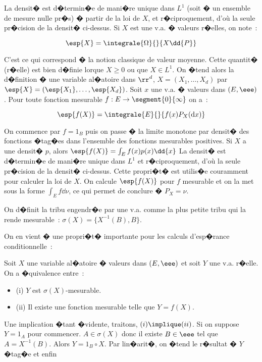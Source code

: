 \rmq La densit� est d�termin�e de mani�re unique dans $L^{1}$ (soit � un ensemble de mesure nulle pr�s) � partir de la loi de $X$, 
et r�ciproquement, d'o\`u la seule pr�cision de la densit� ci-dessus.
 Si $X$ est une v.a. � valeurs r�elles, on note~:\par
$$\esp{X} = \integrale{\Omega}{}{X\dd{P}}$$\par
C'est ce qui correspond � la notion classique de valeur moyenne.
\rmq Cette quantit� (r�elle) est bien d�finie lorque $X\geq 0$ ou que $X\in L^1$. On �tend alors la d�finition � une variable al�atoire
dans ${\rr}^d$, $X = (X_1,\ldots,X_d)$ par $\esp{X} = (\esp{X_1},\ldots,\esp{X_d})$.
\prop{} Soit $x$ une v.a. � valeurs dans $(E,\eee)$. Pour toute fonction mesurable $f : E\to \segment{0}{\infty}$ on a~:\par
$$\esp{f(X)} = \integrale{E}{}{f(x)P_X(\mathrm{d}x)}$$\par
\dem On commence par $f = 1_B$ puis on passe � la limite monotone par densit� des fonctions �tag�es dans l'ensemble des fonctions 
mesurables positives.
\rmq Si $X$ a une densit� $p$, alors $\esp{f(X)} = \int_E{f(x)p(x)\dd{x}}$
\rmq La densit� est d�termin�e de mani�re unique dans $L^{1}$ et r�ciproquement, d'o\`u la seule pr�cision de la densit� ci-dessus.
\rmq Cette propri�t� est utilis�e couramment pour calculer la loi de $X$. On calcule $\esp{f(X)}$ pour $f$ mesurable et on la met sous
la forme $\int_{E}{f\dd{\nu}}$, ce qui permet de conclure � $P_X = \nu$.\par
On d�finit la tribu engendr�e par une v.a. comme la plus petite tribu qui la rende mesurable~: 
$\sigma(X)=\lbrace X^{-1}(B),B\rbrace$.\par
On en vient � une propri�t� importante pour les calculs d'esp�rance conditionnelle~:\par
\prop{} Soit $X$ une variable al�atoire � valeurs dans $(E,\eee)$ et soit $Y$ une v.a. r�elle. On a �quivalence entre~:
\begin{itemize}
\item{(i)} $Y$ est $\sigma(X)$-mesurable.
\item{(ii)} Il existe une fonction mesurable telle que $Y = f(X)$.
\end{itemize}\par
\dem Une implication �tant �vidente, traitons, $(i)\implique (ii)$. Si on suppose $Y = 1_{A}$ pour commencer. $A\in \sigma(X)$ donc
il existe $B\in \eee$ tel que $A = X^{-1}(B)$. Alors $Y = 1_B \circ X$. Par lin�arit�, on �tend le r�sultat � $Y$ �tag�e et enfin 
